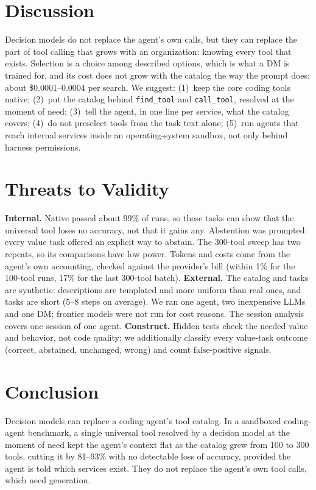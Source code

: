 \documentclass[conference]{IEEEtran}
\begin{document}
\section{Discussion}\label{sec:discussion}
Decision models do not replace the agent's own calls, but they can replace the part of tool calling that grows
with an organization: knowing every tool that exists. Selection is a choice among described options, which is
what a DM is trained for, and its cost does not grow with the catalog the way the prompt does: about
\$0.0001--0.0004 per search. We suggest:
(1)~keep the core coding tools native; (2)~put the catalog behind \texttt{find\_tool} and \texttt{call\_tool},
resolved at the moment of need; (3)~tell the agent, in one line per service, what the catalog covers; (4)~do
not preselect tools from the task text alone; (5)~run agents that reach internal services inside an
operating-system sandbox, not only behind harness permissions.

\section{Threats to Validity}\label{sec:threats}
\textbf{Internal.} Native passed about 99\% of runs, so these tasks can show that the universal tool loses no
accuracy, not that it gains any. Abstention was prompted: every value task offered an explicit way to abstain.
The 300-tool sweep has two repeats, so its comparisons have low power. Tokens and costs come from the agent's
own accounting, checked against the provider's bill (within 1\% for the 100-tool runs, 17\% for the last
300-tool batch).
\textbf{External.} The catalog and tasks are synthetic: descriptions are templated and more uniform than real
ones, and tasks are short (5--8 steps on average). We ran one agent, two inexpensive LLMs and one DM; frontier
models were not run for cost reasons. The session analysis covers one session of one agent.
\textbf{Construct.} Hidden tests check the needed value and behavior, not code quality; we additionally classify
every value-task outcome (correct, abstained, unchanged, wrong) and count false-positive signals.

\section{Conclusion}
Decision models can replace a coding agent's tool catalog. In a sandboxed coding-agent benchmark, a single
universal tool resolved by a decision model at the moment of need kept the agent's context flat as the catalog
grew from 100 to 300 tools, cutting it by 81--93\% with no detectable loss of accuracy, provided the agent is
told which services exist. They do not replace the agent's own tool calls, which need generation.
\end{document}
